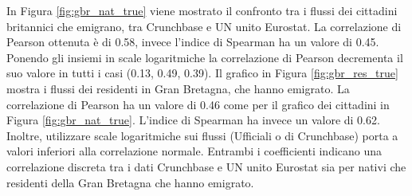 In Figura \ref{fig:gbr_nat_true} viene mostrato il confronto tra i flussi dei cittadini britannici che emigrano, tra  Crunchbase e UN unito Eurostat. 
La correlazione di Pearson ottenuta è di 0.58, invece l'indice di Spearman ha un valore di 0.45. Ponendo gli insiemi in scale logaritmiche la correlazione di Pearson decrementa il suo valore in tutti i casi (0.13, 0.49, 0.39). 
Il grafico in Figura \ref{fig:gbr_res_true} mostra i flussi dei residenti in Gran Bretagna, che hanno emigrato. La correlazione di Pearson ha un valore di 0.46 come per il grafico dei cittadini in Figura \ref{fig:gbr_nat_true}. L'indice di Spearman ha invece un valore di 0.62. Inoltre, utilizzare scale logaritmiche sui flussi (Ufficiali o di Crunchbase) porta a valori inferiori alla correlazione normale. Entrambi i coefficienti indicano una correlazione discreta tra i dati Crunchbase e UN unito Eurostat sia per nativi che residenti della Gran Bretagna che hanno emigrato.
